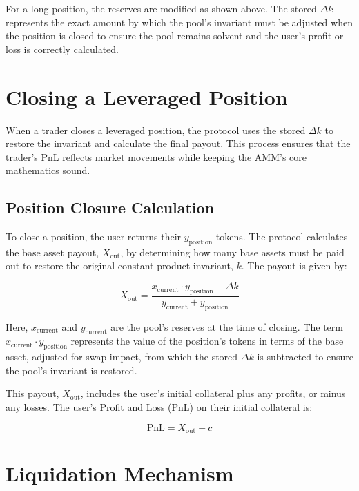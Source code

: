 \documentclass[11pt]{article}
\begin{document}
For a long position, the reserves are modified as shown above. The stored $\Delta k$ represents the exact amount by which the pool's invariant must be adjusted when the position is closed to ensure the pool remains solvent and the user's profit or loss is correctly calculated.

\section{Closing a Leveraged Position}

When a trader closes a leveraged position, the protocol uses the stored $\Delta k$ to restore the invariant and calculate the final payout. This process ensures that the trader's PnL reflects market movements while keeping the AMM's core mathematics sound.

\subsection{Position Closure Calculation}

To close a position, the user returns their $y_{\text{position}}$ tokens. The protocol calculates the base asset payout, $X_{\text{out}}$, by determining how many base assets must be paid out to restore the original constant product invariant, $k$. The payout is given by:

\begin{equation}
X_{\text{out}} = \frac{x_{\text{current}} \cdot y_{\text{position}} - \Delta k}{y_{\text{current}} + y_{\text{position}}}
\end{equation}

Here, $x_{\text{current}}$ and $y_{\text{current}}$ are the pool's reserves at the time of closing. The term $x_{\text{current}} \cdot y_{\text{position}}$ represents the value of the position's tokens in terms of the base asset, adjusted for swap impact, from which the stored $\Delta k$ is subtracted to ensure the pool's invariant is restored.

This payout, $X_{\text{out}}$, includes the user's initial collateral plus any profits, or minus any losses. The user's Profit and Loss (PnL) on their initial collateral is:

\begin{equation}
\text{PnL} = X_{\text{out}} - c
\end{equation}

\section{Liquidation Mechanism}
\end{document}
